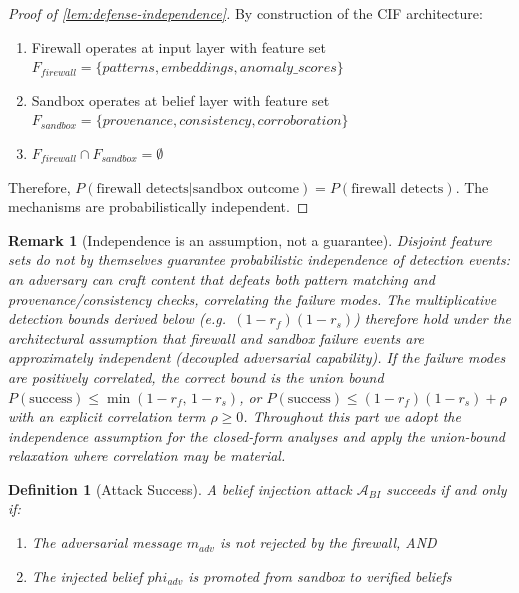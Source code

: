 \documentclass[
]{article}
\newtheorem{definition}{Definition}[section]
\newtheorem{remark}[theorem]{Remark}
\begin{document}
\begin{proof}[Proof of \cref{lem:defense-independence}]
By construction of the CIF architecture:
\begin{enumerate}
\item Firewall operates at input layer with feature set $F_{firewall} = \{patterns, embeddings, anomaly\_scores\}$
\item Sandbox operates at belief layer with feature set $F_{sandbox} = \{provenance, consistency, corroboration\}$
\item $F_{firewall} \cap F_{sandbox} = \emptyset$
\end{enumerate}

Therefore, $P(\text{firewall detects} | \text{sandbox outcome}) = P(\text{firewall detects})$. The mechanisms are probabilistically independent.
\end{proof}

\begin{remark}[Independence is an assumption, not a guarantee]
\label{rem:defense-independence-scope}
Disjoint feature sets do not by themselves guarantee probabilistic independence of detection events: an adversary can craft content that defeats both pattern matching and provenance/consistency checks, correlating the failure modes. The multiplicative detection bounds derived below (e.g.\ $(1-r_f)(1-r_s)$) therefore hold under the architectural \emph{assumption} that firewall and sandbox failure events are approximately independent (decoupled adversarial capability). If the failure modes are positively correlated, the correct bound is the union bound $P(\text{success}) \le \min(1-r_f,\,1-r_s)$, or $P(\text{success}) \le (1-r_f)(1-r_s) + \rho$ with an explicit correlation term $\rho \ge 0$. Throughout this part we adopt the independence assumption for the closed-form analyses and apply the union-bound relaxation where correlation may be material.
\end{remark}

\begin{definition}[Attack Success]
\label{def:attack-success}
A belief injection attack $\mathcal{A}_{BI}$ succeeds if and only if:
\begin{enumerate}
\item The adversarial message $m_{adv}$ is not rejected by the firewall, AND
\item The injected belief $phi_{adv}$ is promoted from sandbox to verified beliefs
\end{enumerate}
\end{definition}
\end{document}
